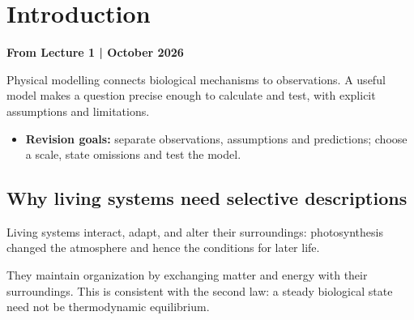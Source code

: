 \chapter{Introduction}\label{chap:introduction}
\noindent\textbf{From Lecture 1 \enspace| October 2026}

Physical modelling connects biological mechanisms to observations. A useful model makes a question precise enough to calculate and test, with explicit assumptions and limitations.

\begin{itemize}[nosep]
\item \textbf{Revision goals:} separate observations, assumptions and predictions; choose a scale, state omissions and test the model.
\end{itemize}

\section{Why living systems need selective descriptions}\label{sec:intro-complexity}
Living systems interact, adapt, and alter their surroundings: photosynthesis changed the atmosphere and hence the conditions for later life.

They maintain organization by exchanging matter and energy with their surroundings. This is consistent with the second law: a steady biological state need not be thermodynamic equilibrium.

